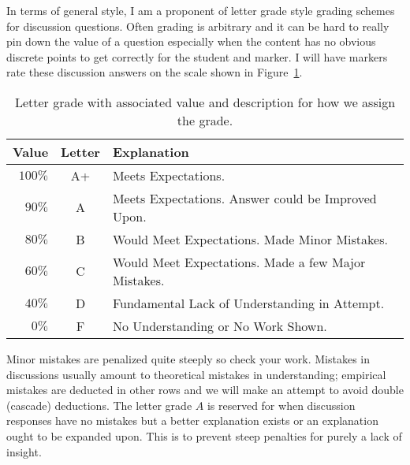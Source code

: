 %
In terms of general style, I am a proponent of letter grade style
grading schemes for discussion questions.
Often grading is arbitrary and it can be hard to really pin down the value of
a question especially when the content has no obvious discrete points to
get correctly for the student and marker. I will have markers
rate these discussion answers on the scale shown in
Figure~\ref{tab:letter-grading}.
%
\begin{table}
\centering
\begin{tabular}{r|c|l}
Value & Letter & Explanation\\ \hline
\(100\%\) & A+ & Meets Expectations.\\ \hline
\(90\%\)  & A & Meets Expectations. Answer could be Improved Upon. \\ \hline
\(80\%\) & B & Would Meet Expectations. Made Minor Mistakes.\\ \hline
\(60\%\) & C & Would Meet Expectations. Made a few Major Mistakes.\\ \hline
\(40\%\) & D & Fundamental Lack of Understanding in Attempt.\\ \hline
\(0\%\) & F & No Understanding or No Work Shown.
\end{tabular}
\caption[Letter Grading Scheme]{Letter grade with associated value and
description for how we assign the grade.}
\label{tab:letter-grading}
\end{table}
%
Minor mistakes are penalized quite steeply so check your work. Mistakes in
discussions usually amount to theoretical mistakes in understanding; empirical
mistakes are deducted in other rows and we will make an attempt to avoid double
(cascade) deductions. The letter grade \(A\) is reserved for when discussion
responses have no mistakes but a better explanation exists or an explanation
ought to be expanded upon. This is to prevent steep penalties for purely a
lack of insight.

